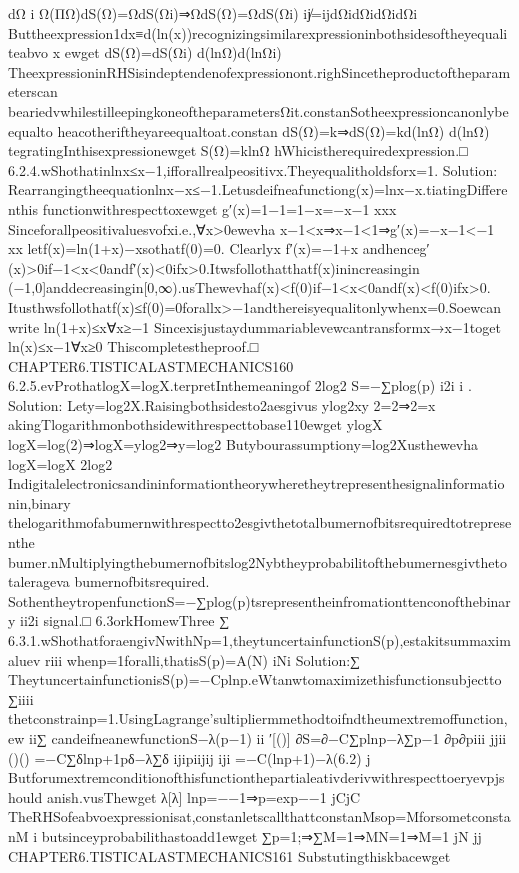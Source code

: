 {{{{{{{{{{dΩ
i
Ω(ΠΩ)dS(Ω)=ΩdS(Ωi)⇒ΩdS(Ω)=ΩdS(Ωi)
ij̸=ijdΩidΩidΩidΩi
Buttheexpression1dx≡d(ln(x))recognizingsimilarexpressioninbothsidesoftheyequaliteabvo
x
ewget
dS(Ω)=dS(Ωi)
d(lnΩ)d(lnΩi)
TheexpressioninRHSisindeptendenofexpressionont.righSincetheproductoftheparameterscan
beariedvwhilestilleepingkoneoftheparametersΩit.constanSotheexpressioncanonlybeequalto
heacotheriftheyareequaltoat.constan
dS(Ω)=k⇒dS(Ω)=kd(lnΩ)
d(lnΩ)
tegratingInthisexpressionewget
S(Ω)=klnΩ
hWhicistherequiredexpression.□
6.2.4.wShothatinlnx≤x−1,ifforallrealpeositivx.Theyequalitholdsforx=1.
Solution:
Rearrangingtheequationlnx−x≤−1.Letusdeifneafunctiong(x)=lnx−x.tiatingDifferenthis
functionwithrespecttoxewget
g′(x)=1−1=1−x=−x−1
xxx
Sinceforallpeositivaluesvofxi.e.,∀x>0ewevha
x−1<x⇒x−1<1⇒g′(x)=−x−1<−1
xx
letf(x)=ln(1+x)−xsothatf(0)=0.
Clearlyx
f′(x)=−1+x
andhenceg′(x)>0if−1<x<0andf′(x)<0ifx>0.Itwsfollothatthatf(x)inincreasingin
(−1,0]anddecreasingin[0,∞).usThewevhaf(x)<f(0)if−1<x<0andf(x)<f(0)ifx>0.
Itusthwsfollothatf(x)≤f(0)=0forallx>−1andthereisyequalitonlywhenx=0.Soewcan
write
ln(1+x)≤x∀x≥−1
Sincexisjustaydummariablevewcantransformx→x−1toget
ln(x)≤x−1∀x≥0
Thiscompletestheproof.□
CHAPTER6.TISTICALASTMECHANICS160
6.2.5.evProthatlogX=logX.terpretInthemeaningof
2log2
S=−∑plog(p)
i2i
i
.
Solution:
Lety=log2X.Raisingbothsidesto2aesgivus
ylog2xy
2=2⇒2=x
akingTlogarithmonbothsidewithrespecttobase110ewget
ylogX
logX=log(2)⇒logX=ylog2⇒y=log2
Butybourassumptiony=log2Xusthewevha
logX=logX
2log2
Indigitalelectronicsandininformationtheorywheretheytrepresenthesignalinformationin,binary
thelogarithmofabumernwithrespectto2esgivthetotalbumernofbitsrequiredtotrepresenthe
bumer.nMultiplyingthebumernofbitslog2Nybtheyprobabilitofthebumernesgivthetotalerageva
bumernofbitsrequired.
SothentheytropenfunctionS=−∑plog(p)tsrepresentheinfromationttenconofthebinary
ii2i
signal.□
6.3orkHomewThree
∑
6.3.1.wShothatforaengivNwithNp=1,theytuncertainfunctionS({p}),estakitsummaximaluev
riii
whenp=1foralli,thatisS({p})=A(N)
iNi
Solution:∑
TheytuncertainfunctionisS({p})=−Cplnp.eWtanwtomaximizethisfunctionsubjectto
∑iiii
thetconstrainp=1.UsingLagrange’sultipliermmethodtoifndtheumextremoffunction,ew
ii∑
candeifneanewfunctionS−λ(p−1)
ii
′[()]
∂S=∂−C∑plnp−λ∑p−1
∂p∂piii
jjii
()()
=−C∑δlnp+1pδ−λ∑δ
ijipiijij
iji
=−C(lnp+1)−λ(6.2)
j
Butforumextremconditionofthisfunctionthepartialeativderivwithrespecttoeryevpjshould
anish.vusThewget
λ[λ]
lnp=−−1⇒p=exp−−1
jCjC
TheRHSofeabvoexpressionisat,constanletscallthattconstanMsop=MforsometconstanM
i
butsinceyprobabilithastoadd1ewget
∑p=1;⇒∑M=1⇒MN=1⇒M=1
jN
jj
CHAPTER6.TISTICALASTMECHANICS161
Substutingthiskbacewget
}}}}}}}}}}
